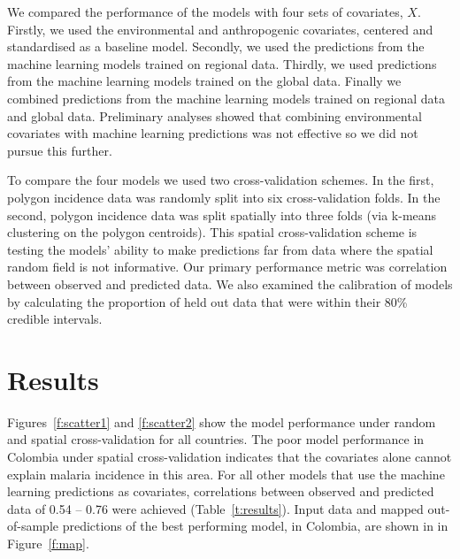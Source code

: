 \documentclass[11pt]{article}
\begin{document}
We compared the performance of the models with four sets of covariates, $X$.
Firstly, we used the environmental and anthropogenic covariates, centered and standardised as a baseline model.
Secondly, we used the predictions from the machine learning models trained on regional data.
Thirdly, we used predictions from the machine learning models trained on the global data.
Finally we combined predictions from the machine learning models trained on regional data and global data.
Preliminary analyses showed that combining environmental covariates with machine learning predictions was not effective so we did not pursue this further.


To compare the four models we used two cross-validation schemes. 
In the first, polygon incidence data was randomly split into six cross-validation folds.
In the second, polygon incidence data was split spatially into three folds (via k-means clustering on the polygon centroids).
This spatial cross-validation scheme is testing the models' ability to make predictions far from data where the spatial random field is not informative.
Our primary performance metric was correlation between observed and predicted data.
We also examined the calibration of models by calculating the proportion of held out data that were within their 80\% credible intervals.


\section{Results}

Figures~\ref{f:scatter1} and \ref{f:scatter2} show the model performance under random and spatial cross-validation for all countries. 
The poor model performance in Colombia under spatial cross-validation indicates that the covariates alone cannot explain malaria incidence in this area. 
For all other models that use the machine learning predictions as covariates, correlations between observed and predicted data of 0.54 -- 0.76 were achieved (Table~\ref{t:results}).
Input data and mapped out-of-sample predictions of the best performing model, in Colombia, are shown in in Figure~\ref{f:map}.


\end{document}
